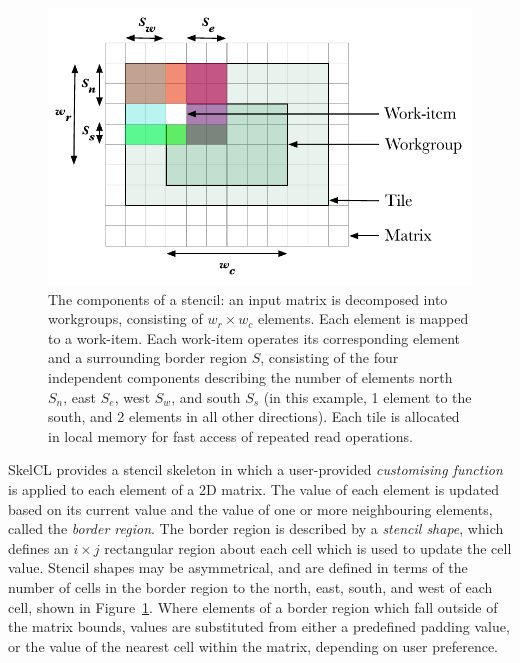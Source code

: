 \documentclass[nonatbib,preprint,10pt]{sigplanconf}
\begin{document}
\begin{figure}
\centering
\includegraphics[width=.75\columnwidth]{img/stencil}
\caption[Stencil border region]{%
  The components of a stencil: an input matrix is decomposed into
  workgroups, consisting of $w_r \times w_c$ elements. Each element is
  mapped to a work-item. Each work-item operates its corresponding
  element and a surrounding border region $S$, consisting of the four
  independent components describing the number of elements north
  $S_n$, east $S_e$, west $S_w$, and south $S_s$ (in this example, 1
  element to the south, and 2 elements in all other directions). Each
  tile is allocated in local memory for fast access of repeated read
  operations.%
}
\label{fig:stencil-shape}
\end{figure}

SkelCL provides a stencil skeleton in which a user-provided
\emph{customising function} is applied to each element of a 2D
matrix. The value of each element is updated based on its current
value and the value of one or more neighbouring elements, called the
\emph{border region}. The border region is described by a
\emph{stencil shape}, which defines an $i \times j$ rectangular region
about each cell which is used to update the cell value. Stencil shapes
may be asymmetrical, and are defined in terms of the number of cells
in the border region to the north, east, south, and west of each cell,
shown in Figure~\ref{fig:stencil-shape}. Where elements of a border
region which fall outside of the matrix bounds, values are substituted
from either a predefined padding value, or the value of the nearest
cell within the matrix, depending on user preference.
\end{document}
